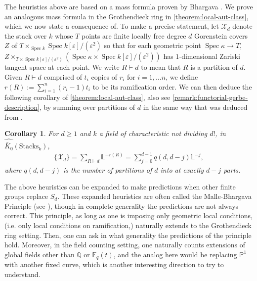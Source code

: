 \documentclass[12 pt]{amsart}
\theoremstyle{plain}
\newtheorem{corollary}[theorem]{Corollary}
\theoremstyle{definition}
\theoremstyle{remark}
\numberwithin{equation}{section}
\newcommand\bl{\mathbb L}
\newcommand\bp{\mathbb P}
\DeclareMathOperator\spec{\operatorname{Spec}}
\newcommand\grcSpaces{\widehat{\widetilde{K_0}}(\mathrm{Spaces}_k)} %
\newcommand\grcStacks{\widehat{\widetilde{K_0}}(\mathrm{Stacks}_k)} %
\newcommand{\Q}{\mathbb Q}
\newcommand{\F}{\mathbb F}
\begin{document}
The heuristics above are based on a mass formula proven by Bhargava
\cite[Theorem 1.1]{Bhargava2010}. We
prove an analogous mass formula in the Grothendieck ring in
\autoref{theorem:local-aut-class},
which we now state a consequence of.
To make a precise statement, let $\mathscr X_d$ denote the stack over $k$ whose $T$
points are finite locally free degree $d$ Gorenstein covers $Z$ of $T
\times_{\spec k} \spec
k[\varepsilon]/(\varepsilon^2)$ so that for each geometric point $\spec \kappa
\to T$, $Z \times_{T \times \spec k[\varepsilon]/(\varepsilon^2)} \left(\spec \kappa \times \spec
k[\varepsilon]/(\varepsilon^2) \right)$ has $1$-dimensional Zariski tangent space at
each point.
We write
$R \vdash d$ to mean that $R$ is a partition
of $d$.
Given  $R  \vdash d$ comprised of $t_i$ copies of $r_i$ for $i=1,\dots n$,
we define $r(R) := \sum_{i=1}^n (r_i- 1)t_i$ to be its ramification order.
We can then deduce the following corollary of \autoref{theorem:local-aut-class},
also see \autoref{remark:functorial-gerbe-description},
by summing over partitions of $d$
in the same way that
\cite[Proposition 2.3]{Bhargava2010}
was deduced from 
\cite[Proposition 2.2]{Bhargava2010}.
\begin{corollary}
	\label{corollary:}
	For $d \geq 1$ and $k$ a field of characteristic not dividing $d!$,
	in $\grcStacks$,
	\begin{align*}
	\{\mathscr X_d\} = 
	\sum_{R \vdash d} \bl^{-r(R)} = 
	\sum_{j=0}^{d-1} q(d,d-j) \bl^{-j},
	\end{align*}
	where $q(d,d-j)$ is the number of partitions of $d$ into at  exactly $d-j$
	parts.
\end{corollary}

The above heuristics can be expanded to make predictions when other finite groups
replace $S_d$. 
These expanded heuristics are often called the Malle-Bhargava Principle (see
\cite{wood:asymptotics-for-number-fields-and-class-groups}),
though in complete generality the predictions are not always correct.  This
principle, as long as one is imposing only geometric local conditions, (i.e. only
local conditions on ramification,) naturally extends to the Grothendieck ring
setting. 
Then, one can ask in what generality the predictions of the principle
hold. 
Moreover, in the field counting setting, one naturally counts extensions of
global fields other than $\Q$ or $\F_q(t)$, and the analog here would be replacing $\bp^1$ with another fixed curve, which is another interesting direction to try to understand.
\end{document}
